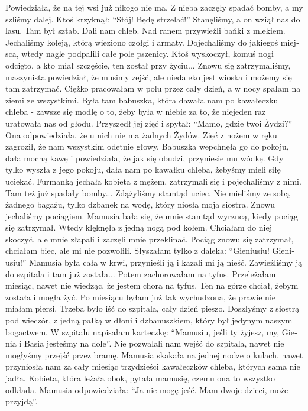 \begin{otherlanguage}{ngerman}
Powiedziała, że na tej wsi już nikogo nie ma. Z nieba zaczęły spadać bomby, a my szliśmy dalej. Ktoś krzyknął: "`Stój! Będę strzelać!"' Stanęliśmy, a on wziął nas do lasu. Tam był sztab. Dali nam chleb. Nad ranem przywieźli bańki z mlekiem. Jechaliśmy koleją, którą wieziono czołgi i armaty. Dojechaliśmy do jakiegoś miejsca, wtedy nagle podpalili całe pole pszenicy. Ktoś wyskoczył, komuś nogi odcięto, a kto miał szczęście, ten został przy życiu... Znowu się zatrzymaliśmy, maszynista powiedział, że musimy zejść, ale niedaleko jest wioska i możemy się tam zatrzymać. Ciężko pracowałam w polu przez cały dzień, a w nocy spałam na ziemi ze wszystkimi. Była tam babuszka, która dawała nam po kawałeczku chleba - zawsze się modlę o to, żeby była w niebie za to, że niejeden raz uratowała nas od głodu. Przyszedł jej zięć i spytał: "`Mamo, gdzie twoi Żydzi?"' Ona odpowiedziała, że u nich nie ma żadnych Żydów. Zięć z nożem w ręku zagroził, że nam wszystkim odetnie głowy. Babuszka wepchnęła go do pokoju, dała mocną kawę i powiedziała, że jak się obudzi, przyniesie mu wódkę. Gdy tylko wyszła z jego pokoju, dała nam po kawałku chleba, żebyśmy mieli siłę uciekać. Furmanką jechała kobieta z mężem, zatrzymali się i pojechaliśmy z nimi. Tam też już spadały bomby... Zdążyliśmy stamtąd uciec. Nie mieliśmy ze sobą żadnego bagażu, tylko dzbanek na wodę, który niosła moja siostra. Znowu jechaliśmy pociągiem. Mamusia bała się, że mnie stamtąd wyrzucą, kiedy pociąg się zatrzymał. Wtedy klęknęła z jedną nogą pod kołem. Chciałam do niej skoczyć, ale mnie złapali i zaczęli mnie przeklinać. Pociąg znowu się zatrzymał, chciałam biec, ale mi nie pozwolili. Słyszałam tylko z daleka: "`Gieniusiu! Gieniusiu!"' Mamusia była cała w krwi, przynieśli ją i kazali mi ją nieść. Zawieźliśmy ją do szpitala i tam już została...  Potem zachorowałam na tyfus. Przeleżałam miesiąc, nawet nie wiedząc, że jestem chora na tyfus. Ten na górze chciał, żebym została i mogła żyć. Po miesiącu byłam już tak wychudzona, że prawie nie miałam piersi. Trzeba było iść do szpitala, cały dzień pieszo. Doszłyśmy z siostrą pod wieczór, z jedną pałką w dłoni i dzbanuszkiem, który był jedynym naszym bogactwem. W szpitalu napisałam karteczkę: "`Mamusiu, jeśli ty żyjesz, my, Gienia i Basia jesteśmy na dole"'. Nie pozwalali nam wejść do szpitala, nawet nie mogłyśmy przejść przez bramę. Mamusia skakała na jednej nodze o kulach, nawet przyniosła nam za cały miesiąc trzydzieści kawałeczków chleba, których sama nie jadła. Kobieta, która leżała obok, pytała mamusię, czemu ona to wszystko odkłada.  Mamusia odpowiedziała: "`Ja nie mogę jeść. Mam dwoje dzieci, może przyjdą"'.

\end{otherlanguage}
